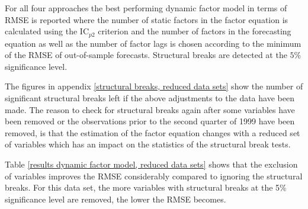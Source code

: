 \documentclass[12pt]{article}
\begin{document}
For all four approaches the best performing dynamic factor model in terms of RMSE is reported where the number of static factors in the factor equation is calculated using the IC$_{p2}$ criterion and the number of factors in the forecasting equation as well as the number of factor lags is chosen according to the minimum of the RMSE of out-of-sample forecasts. Structural breaks are detected at the $5\%$ significance level.

The figures in appendix \ref{structural breaks, reduced data sets} show the number of significant structural breaks left if the above adjustments to the data have been made. The reason to check for structural breaks again after some variables have been removed or the observations prior to the second quarter of 1999 have been removed, is that the estimation of the factor equation changes with a reduced set of variables which has an impact on the statistics of the structural break tests.

Table \ref{results dynamic factor model, reduced data sets} shows that the exclusion of variables improves the RMSE considerably compared to ignoring the structural breaks. For this data set, the more variables with structural breaks at the 5\% significance level are removed, the lower the RMSE becomes.
\end{document}

